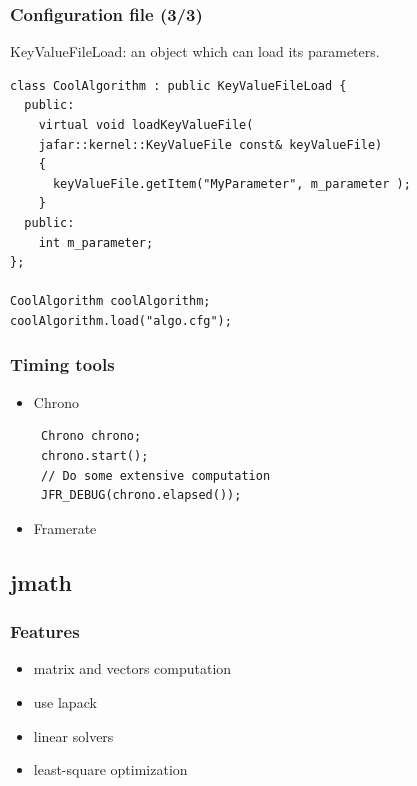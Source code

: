 \documentclass[pdf]{beamer}
\begin{document}

\begin{frame}[fragile]
  \frametitle{Configuration file (3/3)}
KeyValueFileLoad: an object which can load its parameters.
 
\begin{lstlisting}
class CoolAlgorithm : public KeyValueFileLoad {
  public:
    virtual void loadKeyValueFile(
    jafar::kernel::KeyValueFile const& keyValueFile)
    {
      keyValueFile.getItem("MyParameter", m_parameter );
    }
  public:
    int m_parameter;
};

CoolAlgorithm coolAlgorithm;
coolAlgorithm.load("algo.cfg");
\end{lstlisting}
 
\end{frame}


\begin{frame}[fragile]
  \frametitle{Timing tools}
  \begin{itemize}
    \item<1-> Chrono
\begin{lstlisting}
 Chrono chrono;
 chrono.start();
 // Do some extensive computation
 JFR_DEBUG(chrono.elapsed());
\end{lstlisting}
    \item<2-> Framerate
  \end{itemize}

\end{frame}


\subsection{jmath}
\begin{frame}
  \frametitle{Features}
  \begin{itemize}
   \item matrix and vectors computation
   \item use lapack
   \item linear solvers
   \item least-square optimization
  \end{itemize}
\end{frame}
\end{document}
